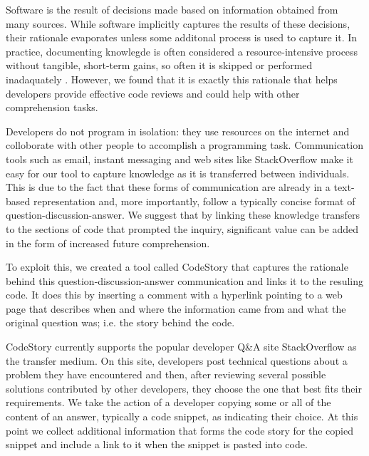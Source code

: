 \documentclass[../manifest.tex]{subfiles}
\begin{document}
Software is the result of decisions made based on information obtained from many sources. While software implicitly captures the results of these decisions, their rationale evaporates unless some additonal process is used to capture it. In practice, documenting knowlegde is often considered a resource-intensive process without tangible, short-term gains, so often it is skipped or performed inadaquately \cite{OZ2008,NH2007}. However, we found that it is exactly this rationale that helps developers provide effective code reviews and could help with other comprehension tasks.

Developers do not program in isolation: they use resources on the internet and colloborate with other people to accomplish a programming task. Communication tools such as email, instant messaging and web sites like StackOverflow make it easy for our tool to capture knowledge as it is transferred between individuals. This is due to the fact that these forms of communication are already in a text-based representation and, more importantly, follow a typically concise format of question-discussion-answer. We suggest that by linking these knowledge transfers to the sections of code that prompted the inquiry, significant value can be added in the form of increased future comprehension.

To exploit this, we created a tool called CodeStory that captures the rationale behind this question-discussion-answer communication and links it to the resuling code. It does this by inserting a comment with a hyperlink pointing to a web page that describes when and where the information came from and what the original question was; i.e. the story behind the code.

CodeStory currently supports the popular developer Q\&A site StackOverflow as the transfer medium. On this site, developers post technical questions about a problem they have encountered and then, after reviewing several possible solutions contributed by other developers, they choose the one that best fits their requirements. We take the action of a developer copying some or all of the content of an answer, typically a code snippet, as indicating their choice. At this point we collect additional information that forms the code story for the copied snippet and include a link to it when the snippet is pasted into code.
\end{document}
